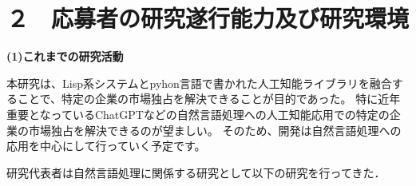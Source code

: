 \documentclass[11pt,a4j,dvipdfmx]{jarticle} 					%
\newcommand{\研究課題名}{人工知能のためのLispシステム}
\newcommand{\研究機関名}{大阪公立大学工業高等専門学校}
\newcommand{\研究代表者氏名}{新妻弘崇}
\newcommand{\研究期間の最終元号年度}{11}  %
\begin{document}








\section{２　応募者の研究遂行能力及び研究環境}



\textbf{(1)これまでの研究活動}

本研究は、Lisp系システムとpyhon言語で書かれた人工知能ライブラリを融合することで、特定の企業の市場独占を解決できることが目的であった。
特に近年重要となっているChatGPTなどの自然言語処理への人工知能応用での特定の企業の市場独占を解決できるのが望ましい。
そのため、開発は自然言語処理への応用を中心にして行っていく予定です。


研究代表者は自然言語処理に関係する研究として以下の研究を行ってきた．
\end{document}

